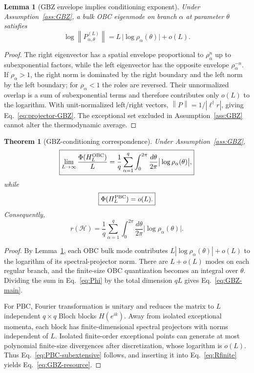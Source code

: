 \documentclass[reprint,amsmath,amssymb,aps,nofootinbib]{revtex4-2}
\newtheorem{theorem}{Theorem}
\newtheorem{lemma}{Lemma}
\newcommand{\norm}[1]{\left\lVert #1\right\rVert}
\newcommand{\PhiC}{\Phi}
\begin{document}
\begin{lemma}[GBZ envelope implies conditioning exponent]
\label{lem:GBZ-envelope}
Under Assumption~\ref{ass:GBZ}, a bulk OBC eigenmode on branch $\alpha$ at
parameter $\theta$ satisfies
\begin{equation}
\log\norm{P_{\alpha,\theta}^{(L)}}
=L\,\big|\log\rho_\alpha(\theta)\big|+o(L).
\label{eq:projector-GBZ}
\end{equation}
\end{lemma}

\begin{proof}
The right eigenvector has a spatial envelope proportional to
$\rho_\alpha^n$ up to subexponential factors, while the left eigenvector has
the opposite envelope $\rho_\alpha^{-n}$. If $\rho_\alpha>1$, the right norm
is dominated by the right boundary and the left norm by the left boundary;
for $\rho_\alpha<1$ the roles are reversed. Their unnormalized overlap is a
sum of subexponential terms and therefore contributes only $o(L)$ to the
logarithm. With unit-normalized left/right vectors,
$\norm{P}=1/|\ell^\dagger r|$, giving Eq.~\eqref{eq:projector-GBZ}.
The exceptional set excluded in Assumption~\ref{ass:GBZ} cannot alter the
thermodynamic average.
\end{proof}

\begin{theorem}[GBZ-conditioning correspondence]
\label{thm:GBZ}
Under Assumption~\ref{ass:GBZ},
\begin{equation}
\boxed{
\lim_{L\to\infty}\frac{\PhiC(H_L^{\rm OBC})}{L}
=\frac{1}{q}\sum_{\alpha=1}^{q}
\int_0^{2\pi}\frac{d\theta}{2\pi}
\big|\log\rho_\alpha(\theta)\big|,
}
\label{eq:GBZ-main}
\end{equation}
while
\begin{equation}
\boxed{
\PhiC(H_L^{\rm PBC})=o(L).
}
\label{eq:PBC-subextensive}
\end{equation}
Consequently,
\begin{equation}
\boxed{
 r(\mathscr H)
=\frac{1}{q}\sum_{\alpha=1}^{q}
\int_0^{2\pi}\frac{d\theta}{2\pi}
\big|\log\rho_\alpha(\theta)\big|.
}
\label{eq:GBZ-resource}
\end{equation}
\end{theorem}

\begin{proof}
By Lemma~\ref{lem:GBZ-envelope}, each OBC bulk mode contributes
$L|\log\rho_\alpha(\theta)|+o(L)$ to the logarithm of its spectral-projector
norm. There are $L+o(L)$ modes on each regular branch, and the finite-size
OBC quantization becomes an integral over $\theta$. Dividing the sum in
Eq.~\eqref{eq:Phi} by the total dimension $qL$ gives
Eq.~\eqref{eq:GBZ-main}.

For PBC, Fourier transformation is unitary and reduces the matrix to $L$
independent $q\times q$ Bloch blocks $H(e^{ik})$. Away from isolated exceptional
momenta, each block has finite-dimensional spectral projectors with norms
independent of $L$. Isolated finite-order exceptional points can generate at
most polynomial finite-size divergences after discretization, whose logarithm
is $o(L)$. Thus Eq.~\eqref{eq:PBC-subextensive} follows, and inserting it into
Eq.~\eqref{eq:Rfinite} yields Eq.~\eqref{eq:GBZ-resource}.
\end{proof}
\end{document}
